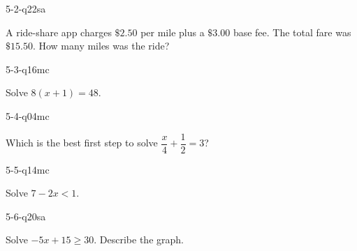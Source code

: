 \begin{practiceQuestion}{5-2-q22}{sa}
\begin{questionText}
A ride-share app charges $\$2.50$ per mile plus a $\$3.00$ base fee. The total fare was $\$15.50$. How many miles was the ride?
\end{questionText}
\end{practiceQuestion}

\begin{practiceQuestion}{5-3-q16}{mc}
\begin{questionText}
Solve $8(x + 1) = 48$.
\end{questionText}
\end{practiceQuestion}

\begin{practiceQuestion}{5-4-q04}{mc}
\begin{questionText}
Which is the best first step to solve $\dfrac{x}{4} + \dfrac{1}{2} = 3$?
\end{questionText}
\end{practiceQuestion}

\begin{practiceQuestion}{5-5-q14}{mc}
\begin{questionText}
Solve $7 - 2x < 1$.
\end{questionText}
\end{practiceQuestion}

\begin{practiceQuestion}{5-6-q20}{sa}
\begin{questionText}
Solve $-5x + 15 \geq 30$. Describe the graph.
\end{questionText}
\end{practiceQuestion}

